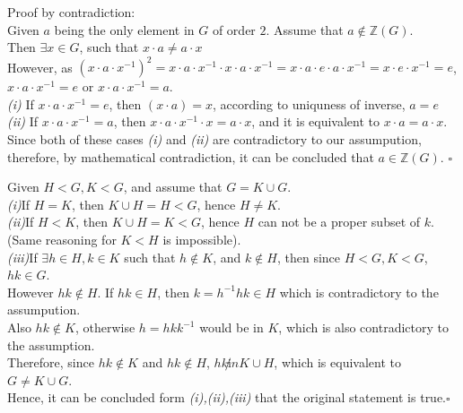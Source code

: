 \documentclass[11pt]{article}
\newenvironment{problem}[2][Problem]{\begin{trivlist}
\item[\hskip \labelsep {\bfseries #1}\hskip \labelsep {\bfseries #2.}]}{\end{trivlist}}
\begin{document}
\begin{problem}{3} Proof by contradiction:\\
Given $a$ being the only element in $G$ of order $2$. Assume that $a \notin \mathbb{Z}(G)$.\\
Then $\exists x \in G$, such that $x\cdot a \neq a \cdot x$\\
However, as $(x\cdot a \cdot x^{-1})^2 = x \cdot a \cdot x^{-1} \cdot x \cdot a \cdot x^{-1} = x\cdot a \cdot e \cdot a \cdot x^{-1} = x \cdot e \cdot x^{-1} = e$,\\
$x\cdot a \cdot x^{-1} = e$ or $x\cdot a \cdot x^{-1} = a$.\\
\textit{(i)} If $x \cdot a \cdot x^{-1}=e$, then $(x\cdot a) =x $, according to uniquness of inverse, $a = e$\\
\textit{(ii)} If $x \cdot a \cdot x^{-1}=a$, then $ x \cdot a \cdot x^{-1} \cdot x = a \cdot x$, and it is equivalent to $x\cdot a = a \cdot x$.\\
Since both of these cases \textit{(i)} and \textit{(ii)} are contradictory to our assumpution, therefore, by mathematical contradiction, it can be concluded that $a \in \mathbb{Z}(G)$. $\square$\\
\end{problem}

\begin{problem}{4}
Given $H<G, K<G$, and assume that $G = K \cup G$.\\
\textit{(i)}If $H = K$, then $K \cup H  = H < G$, hence $H \neq K$.\\
\textit{(ii)}If $H<K$, then $K \cup H = K <G$, hence $H$ can not be a proper subset of $k$. (Same reasoning for $K<H$ is impossible).\\
\textit{(iii)}If $\exists h \in H, k\in K$ such that $h\notin K$, and $k \notin H$, then since $H<G, K<G$, $hk \in G$.\\
However $hk \notin H$. If $hk \in H$, then $k = h^{-1} hk \in H$ which is contradictory to the assumpution.\\
Also $hk \notin K$, otherwise $h = hkk^{-1}$ would be in $K$, which is also contradictory to the assumption.\\
Therefore, since $hk \notin K$ and $hk \notin H$, $hk \not in K\cup H$, which is equivalent to $G \neq K\cup G$.\\
Hence, it can be concluded form \textit{(i),(ii),(iii)} that the original statement is true.$\square$\\

\end{problem}
\end{document}
